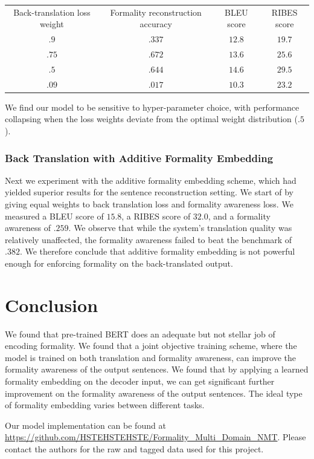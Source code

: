 \documentclass[11pt]{article}
\begin{document}
\begin{tabular}{ c c c c }
    Back-translation loss weight & Formality reconstruction accuracy & BLEU score & RIBES score \\
    $.9$ & $.337$ & $12.8$ & $19.7$ \\
    $.75$ & $.672$ & $13.6$ & $25.6$ \\
    $.5$ & $.644$ & $14.6$ & $29.5$ \\
    $.09$ & $.017$ & $10.3$ & $23.2$ \\
\end{tabular}

We find our model to be sensitive to hyper-parameter choice, with performance collapsing when the loss weights deviate from the optimal weight distribution ($.5$). 

\subsubsection{Back Translation with Additive Formality Embedding}

Next we experiment with the additive formality embedding scheme, which had yielded superior results for the sentence reconstruction setting. We start of by giving equal weights to back translation loss and formality awareness loss. We measured a BLEU score of $15.8$, a RIBES score of $32.0$, and a formality awareness of $.259$. We observe that while the system's translation quality was relatively unaffected, the formality awareness failed to beat the benchmark of $.382$. We therefore conclude that additive formality embedding is not powerful enough for enforcing formality on the back-translated output.

\section{Conclusion}

We found that pre-trained BERT does an adequate but not stellar job of encoding formality. We found that a joint objective training scheme, where the model is trained on both translation and formality awareness, can improve the formality awareness of the output sentences. We found that by applying a learned formality embedding on the decoder input, we can get significant further improvement on the formality awareness of the output sentences. The ideal type of formality embedding varies between different tasks.

Our model implementation can be found at \url{https://github.com/HSTEHSTEHSTE/Formality_Multi_Domain_NMT}. Please contact the authors for the raw and tagged data used for this project.
\end{document}
